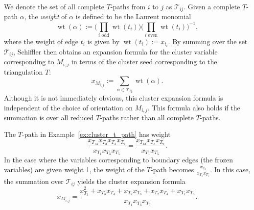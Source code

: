 \documentclass[10pt,a4paper]{amsart}
\numberwithin{equation}{section}
\DeclareMathOperator{\wt}{wt}
\begin{document}
\begin{Example}
\begin{center}
\end{center}
\end{Example}
We denote the set of all complete $T$-paths from $i$ to $j$ as $\mathcal{T}_{ij}$. Given a complete $T$-path $\alpha$, the \emph{weight} of $\alpha$ is defined to be the Laurent monomial
\[ \wt(\alpha) := \bigg( \prod_{i \textrm{ odd}} \wt(t_{i}) \bigg)\bigg( \prod_{i \textrm{ even}} \wt(t_i) \bigg)^{-1}, \]
where the weight of edge $t_i$ is given by $\wt(t_i) := x_{t_i}$. By summing over the set $\mathcal{T}_{ij}$, Schiffler \cite{S-10} then obtains an expansion formula for the cluster variable corresponding to $M_{i,j}$ in terms of the cluster seed corresponding to the triangulation $T$:
\[ x_{M_{i,j}} := \sum_{\alpha \in \mathcal{T}_{ij}} \wt(\alpha). \]
Although it is not immediately obvious, this cluster expansion formula is independent of the choice of orientation on $M_{i,j}$. This formula also holds if the summation is over all reduced $T$-paths rather than all complete $T$-paths.
\begin{Example}
The $T$-path in Example~\ref{ex:cluster_t_path} has weight \[\frac{x_{T_{13}}x_{T_3}x_{T_3}x_{T_9}}{x_{T_1}x_{T_3}x_{T_5}}=\frac{x_{T_{13}}x_{T_3}x_{T_9}}{x_{T_1}x_{T_5}}.\] In the case where the variables corresponding to boundary edges (the frozen variables) are given weight 1, the weight of the $T$-path becomes $\frac{x_{T_3}}{x_{T_1}x_{T_5}}.$ In this case, the summation over $\mathcal{T}_{ij}$ yields the cluster expansion formula
\[ x_{M_{i,j}} = \frac{x_{T_3}^2 + x_{T_3}x_{T_4} + x_{T_2}x_{T_3} + x_{T_2}x_{T_4} + x_{T_1}x_{T_5}}{x_{T_1}x_{T_3}x_{T_5}}.\]
\end{Example}
\end{document}
